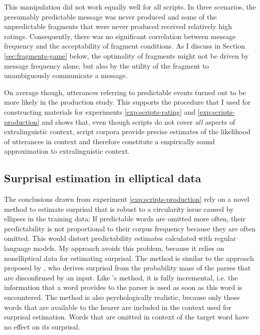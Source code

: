 This manipulation did not work equally well for all scripts. In three scenarios, the presumably predictable message was never produced and some of the unpredictable fragments that were never produced received relatively high ratings. Consequently, there was no significant correlation between message frequency and the acceptability of fragment conditions. As I discuss in Section \ref{sec:fragments-game} below, the optimality of fragments might not be driven by message frequency alone, but also by the utility of the fragment to unambiguously communicate a message.

On average though, utterances referring to predictable events turned out to be more likely in the production study. This supports the procedure that I used for constructing materials for experiments \ref{exp:scripts-rating} and \ref{exp:scripts-production} and shows that, even though scripts do not cover \textit{all} aspects of extralinguistic context, script corpora provide precise estimates of the likelihood of utterances in context and therefore constitute a empirically sound approximation to extralinguistic context.

\subsection{Surprisal estimation in elliptical data}

The conclusions drawn from experiment \ref{exp:scripts-production} rely on a novel method to estimate surprisal that is robust to a circularity issue caused by ellipses in the training data: If predictable words are omitted more often, their predictability is not proportional to their corpus frequency because they are often omitted. This would distort predictability estimates calculated with regular language models. My approach avoids this problem, because it relies on nonelliptical data for estimating surprisal. The method is similar to the approach proposed by \citet{hale2001}, who derives surprisal from the probability mass of the parses that are disconfirmed by an input. Like \citeauthor{hale2001}'s method, it is fully incremental, i.e. the information that a word provides to the parser is used as soon as this word is encountered. The method is also psychologically realistic, because only those words that are available to the hearer are included in the context used for surprisal estimation. Words that are omitted in context of the target word have no effect on its surprisal.

